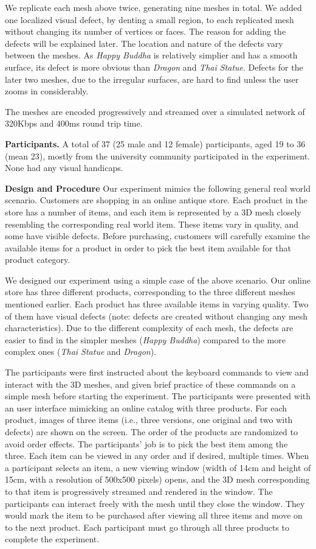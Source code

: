 We replicate each mesh above twice, generating nine meshes in total.  
We added one localized visual defect, by denting a small region, to each replicated mesh 
without changing its number of vertices or faces. The reason for adding the defects will be explained later. 
The location and nature of the
defects vary between the meshes. As \textit{Happy Buddha} is
relatively simplier and has a smooth surface, its defect is
 more obvious than \textit{Dragon}
and \textit{Thai Statue}.  Defects for the later two meshes, due to the
irregular surfaces, are hard to find unless the user zooms in
considerably.

The meshes are encoded progressively and streamed over a simulated network of 320Kbps and 400ms round trip time.  

\textbf{Participants.}
A total of 37 (25 male and 12 female) participants, aged 19 to 36
(mean 23), mostly from the university community participated in the
experiment. None had any visual handicaps.

\textbf{Design and Procedure}
Our experiment mimics the following general real world scenario. Customers
are shopping in an online antique store. Each product in the store has a
number of items, and each item is represented by a 3D mesh closely resembling
the corresponding real world item. These items vary in quality, and some
have visible defects. Before purchasing, customers will carefully examine the
available items for a product in order to pick the best item available for
that product category.

We designed our experiment using a simple case of the above scenario. 
Our online store has three different products,
corresponding to the three different meshes mentioned earlier. Each product
has three available items in varying quality. Two of them have visual
defects (note: defects are created without changing any mesh
characteristics). Due to the different complexity of each mesh, the defects
are easier to find in the simpler meshes (\textit{Happy Buddha}) compared to the more
complex ones (\textit{Thai Statue} and \textit{Dragon}).

The participants were first instructed about the keyboard commands 
to view and interact with the 3D meshes, and given brief practice of
these commands on a simple mesh before starting the experiment. The
participants were presented with an user interface mimicking an online
catalog with three products.  For each product, images of three items 
(i.e., three versions, one original and two with defects) are shown on the screen.
The order of the products are randomized to avoid order effects.
The participants' job is to pick the best item among the three. Each item 
can be viewed in any order and if desired, multiple times.  When 
a participant selects an item, a new viewing window (width of 14cm and
height of 15cm, with a resolution of 500x500 pixels) opens, and the 3D mesh corresponding to that item is
progressively streamed and rendered in the window.  
The participants can interact freely
with the mesh until they close the window.
They would mark the item to be purchased after viewing all three items and
move on to the next product. Each participant must go through all three products to
complete the experiment.


